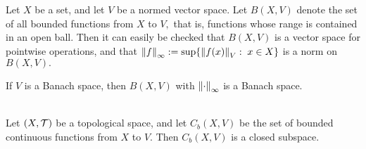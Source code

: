 \noindent Let $X$ be a set, and let $V$ be a normed vector space. Let $B(X,V)$ denote the set of all bounded functions from $X$ to $V,$ that is, functions whose range is contained in an open ball. Then it can easily be checked that $B(X,V)$ is a vector space for pointwise operations, and that $\left\lVert f\right\rVert_{\infty}:=\sup\{\left\lVert f(x)\right\rVert_V:\;x\in X\}$ is a norm on $B(X,V).$

\begin{prop}
If $V$ is a Banach space, then $B(X,V)$ with $\left\lVert\cdot\right\rVert_{\infty}$ is a Banach space.\\ \\
\end{prop}

\begin{prop}
Let $(X,\mathcal{T})$ be a topological space, and let $C_b(X,V)$ be the set of bounded continuous functions from $X$ to $V.$ Then $C_b(X,V)$ is a closed subspace. \\ \\
\end{prop}

